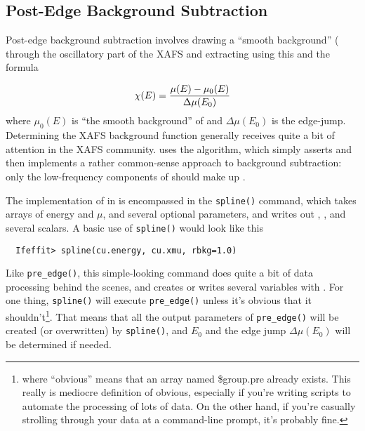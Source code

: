 \documentclass[11pt]{article}
\begin{document}
\subsection{Post-Edge Background Subtraction}\label{s:xafs-process:spline}

Post-edge background subtraction involves drawing a ``smooth background''
({\bkg} through the oscillatory part of the XAFS and extracting
{\chik} using this and the formula

\[
\chi(E) = {{\mu(E) - \mu_0(E)}\over{\Delta \mu(E_0)}}
\]
\noindent
where $ \mu_0(E)$ is ``the smooth background'' of {\muE} and $\Delta
\mu(E_0)$ is the edge-jump.  Determining the XAFS background function
{\bkg} generally receives quite a bit of attention in the XAFS community.
{\ifeffit} uses the {\autobk} algorithm, which simply asserts and then
implements a rather common-sense approach to background subtraction: only
the low-frequency components of {\muE} should make up {\bkg}.

The implementation of {\autobk} in {\ifeffit} is encompassed in the
{\tt{spline()}} command, which takes arrays of energy and $\mu$, and several
optional parameters, and writes out {\chik}, {\bkg}, and several
scalars. A basic use of {\tt{spline()}} would look like this
{\small\begin{verbatim}
  Ifeffit> spline(cu.energy, cu.xmu, rbkg=1.0)
\end{verbatim}
}\noindent
Like {\tt{pre\_edge()}}, this simple-looking command does quite a bit of
data processing behind the scenes, and creates or writes several variables
with {\ifeffit}.  For one thing, {\tt{spline()}} will execute
{\tt{pre\_edge()}} unless it's obvious that it shouldn't{\footnote{where
    ``obvious'' means that an array named {\$group.pre} already exists.
    This really is mediocre definition of obvious, especially if
    you're writing scripts to automate the processing of lots of data.  On
    the other hand, if you're casually strolling through your data at a
    command-line prompt, it's probably fine.}}.  That means that all the
output parameters of {\tt{pre\_edge()}} will be created (or overwritten) by
{\tt{spline()}}, and $E_0$ and the edge jump $\Delta \mu(E_0)$ will be
determined if needed.
\end{document}
